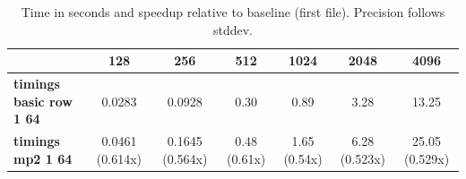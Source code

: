 \begin{table}[H]
\centering
\begin{tabular}{|l|c|c|c|c|c|c|}
\hline
 & \textbf{128} & \textbf{256} & \textbf{512} & \textbf{1024} & \textbf{2048} & \textbf{4096} \\
\hline
\textbf{timings basic row 1 64} 
& 0.0283
& 0.0928
& 0.30
& 0.89
& 3.28
& 13.25 \\

\textbf{timings mp2 1 64} 
& 0.0461 (0.614x)
& 0.1645 (0.564x)
& 0.48 (0.61x)
& 1.65 (0.54x)
& 6.28 (0.523x)
& 25.05 (0.529x) \\

\hline
\end{tabular}
\caption{Time in seconds and speedup relative to baseline (first file). Precision follows stddev.}
\end{table}
